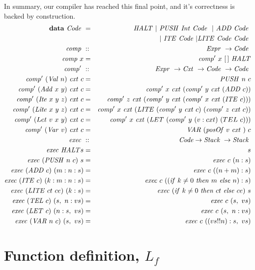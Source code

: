 \documentclass {article}
\begin{document}
In summary, our compiler has reached this final point, and it's 
correctness is backed by construction.
\begin{eqnarray*}
\mathbf{data}\  \Code &=& \HALT\ |\ \PUSH \Int \Code\ 
					|\ \ADD \Code \\
		 			&&	|\ \ITE \Code | \LITE \Code \Code \\
\Comp &::& \Expr \rightarrow \Code \\
\Comp x &=& \Compp  x\ [\, ]\ \HALT \\
\Compp &::& \Expr \rightarrow \Cxt \rightarrow \Code \rightarrow \Code  \\
\Compp  (\Val n)\ \cxtm c &=& \PUSH n\ c \\
\Compp  (\Add x\ y)\ \cxtm c 
			&=& \Compp  x\ \cxtm (\Compp  y\ \cxtm (\ADD c))\\
\Compp  (\Ite x\ y\ z)\ \cxtm c
				&=& \Compp  z\ \cxtm (\Compp  y\ \cxtm (\Compp  x\ \cxtm (\ITE c))) \\
\Compp  (\Lite x\ y\ z)\ \cxtm c
			&=& \Compp  x\ \cxtm (\LITE (\Compp  y\ \cxtm c)\ (\Compp  z\ \cxtm c)) \\
\Compp  (Let\ v\ x\ y)\ \cxtm c
		&=& \Compp  x\ \cxtm (\LET (\Compp  y\ (v:cxt)\ (TEL\ c))) \\
\Compp (\Var v)\ \cxtm c       &=&   \VAR (\mathit{posOf}\ v\ \cxtm)\ c \\
\Exec &::& \code  \rightarrow \Stack \rightarrow \Stack  \\
\Exec \HALT s &=& s  \\
\Exec (\PUSH n\ c)\ s &=& \Exec c\ (n:s) \\
\Exec (\ADD c)\ (m:n:s) &=& \Exec c\ ((n + m):s)  \\
\Exec (\ITE c)\ (k:m:n:s) 
			&=& \Exec c\ ((\ifff k \not=0\ \tthen m\ \eelse n):s) \\
\Exec (\LITE ct\ ce)\ (k:s) 
				&=& \Exec (\ifff k \not=0\ \tthen ct\ \eelse ce)\ s \\
\Exec (\TEL c)\ (s,\ n:vs) &=& \Exec c\ (s,\ vs) \\
\Exec (\LET c)\ (n:s,\ vs) &=& \Exec c\ (s,\ n:vs) \\
\Exec (\VAR n\ c)\  ( s,\ vs) &=& \Exec c\ ((vs!!n):s,\ vs) \\
\end{eqnarray*}


\pagebreak
\section{Function definition, $L_f$} \label{langfunc}
\end{document}
